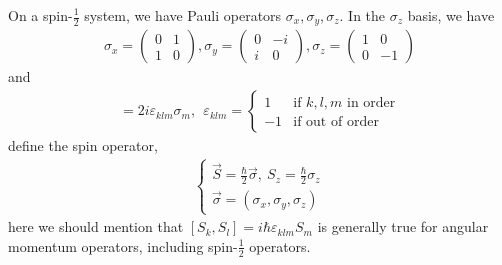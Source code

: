 \documentclass[UTF8,12pt]{article} %
\begin{document}
On a spin-$\frac{1}{2}$ system, we have Pauli operators $\sigma_{x}, \sigma_{y}, \sigma_{z}$. In the $\sigma_{z}$ basis, we have
\begin{align}
\sigma_{x} = \begin{pmatrix}0&1\\1&0\end{pmatrix}, \sigma_{y} = \begin{pmatrix}0&-i\\i&0\end{pmatrix}, \sigma_{z} = \begin{pmatrix}1&0\\0&-1\end{pmatrix}
\end{align}
and
\begin{align}
[\sigma_{k}, \sigma_{l}] = 2i\varepsilon_{klm}\sigma_{m}, ~~\varepsilon_{klm} = \begin{cases}1 &\text{if } k,l,m \text{ in order}\\-1 &\text{if out of order}\end{cases}
\end{align}
define the spin operator,
\begin{align}
\begin{cases}
\vec{S} = \frac{\hbar}{2}\vec{\sigma},~ S_{z} = \frac{\hbar}{2}\sigma_{z}\\
\vec{\sigma} = (\sigma_{x}, \sigma_{y}, \sigma_{z})
\end{cases}
\end{align}
here we should mention that $\boxed{[S_{k}, S_{l}] = i\hbar\varepsilon_{klm}S_{m}}$ is generally true for angular momentum operators, including spin-$\frac{1}{2}$ operators.
\end{document}
